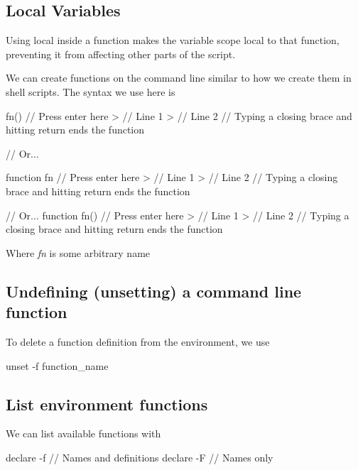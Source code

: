 \documentclass{report}
\begin{document}
    \bigbreak \noindent 
    \subsection{Local Variables}
    \bigbreak \noindent 
    Using local inside a function makes the variable scope local to that function, preventing it from affecting other parts of the script.

    \bigbreak \noindent 






    \pagebreak 
    \bigbreak \noindent 
    We can create functions on the command line similar to how we create them in shell scripts. The syntax we use here is 
    \bigbreak \noindent 
    \begin{bashcode}
        fn() { // Press enter here
            > // Line 1
            > // Line 2
        } // Typing a closing brace and hitting return ends the function

        // Or...

        function fn { // Press enter here
            > // Line 1
            > // Line 2
        } // Typing a closing brace and hitting return ends the function

        // Or...
        function fn() { // Press enter here
            > // Line 1
            > // Line 2
        } // Typing a closing brace and hitting return ends the function
    \end{bashcode}
    \bigbreak \noindent 
    Where \textit{fn} is some arbitrary name
    \bigbreak \noindent 
    \subsection{Undefining (unsetting) a command line function}
    \bigbreak \noindent 
    To delete a function definition from the environment, we use
    \bigbreak \noindent 
    \begin{bashcode}
    unset -f function_name
    \end{bashcode}

    \bigbreak \noindent 
    \subsection{List environment functions}
    \bigbreak \noindent 
    We can list available functions with
    \bigbreak \noindent 
    \begin{bashcode}
    declare -f // Names and definitions
    declare -F // Names only
    \end{bashcode}
\end{document}
